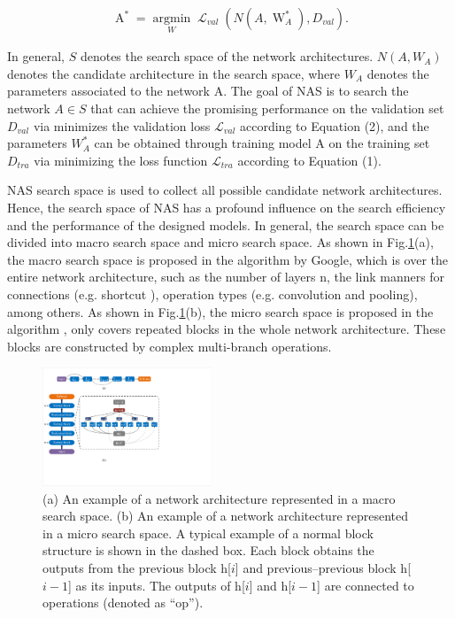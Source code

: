 \documentclass[journal]{IEEEtran}
\begin{document}
\begin{align}\label{2}
\mathop A\nolimits^*  = \mathop {\arg \min }\limits_W \mathop \mathcal{L}\nolimits_{val} (N(A,\mathop W\nolimits_A^*), D_{val}).
\end{align}

In general, $S$ denotes the search space of the network architectures. $N(A, W_A)$ denotes the candidate architecture in the search space, where $W_A$ denotes the parameters associated to the network A. The goal of NAS is to search the network $A \in S$ that can achieve the promising performance on the validation set $D_{val}$ via minimizes the validation loss $\mathcal{L}_{val}$ according to Equation (2), and the parameters $W_A^*$ can be obtained through training model A on the training set $D_{tra}$ via minimizing the loss function $\mathcal{L}_{tra}$ according to Equation (1). 

NAS search space is used to collect all possible candidate network architectures. Hence, the search space of NAS has a profound influence on the search efficiency and the performance of the designed models. In general, the search space can be divided into macro search space and micro search space. As shown in Fig.\ref{Fig_1}(a), the macro search space is proposed in the algorithm \cite{baker2016designing} by Google, which is over the entire network architecture, such as the number of layers n, the link manners for connections (e.g. shortcut \cite{he2016deep}), operation types (e.g. convolution and pooling), among others. As shown in Fig.\ref{Fig_1}(b), the micro search space is proposed in the algorithm \cite{zoph2018learning}, only covers repeated blocks in the whole network architecture. These blocks are constructed by complex multi-branch operations.

\begin{figure}[H]
\centering %
\includegraphics[width=0.45\textwidth]{2.pdf} %
\caption{(a) An example of a network architecture represented in a macro search space. (b) An example of a network architecture represented in a micro search space. A typical example of a normal block structure is shown in the dashed box. Each block obtains the outputs from the previous block h[$i$] and previous–previous block h[$i-1$] as its inputs. The outputs of h[$i$] and h[$i-1$] are connected to operations (denoted as “op”). } %
\label{Fig_1}
\end{figure}
\end{document}
